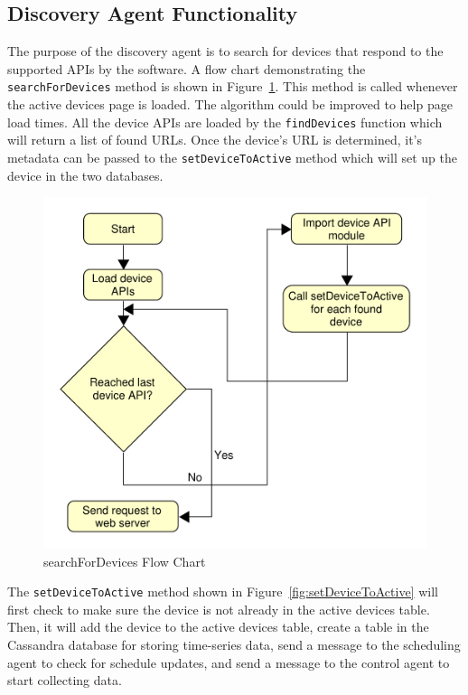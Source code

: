 \subsection{Discovery Agent Functionality}
The purpose of the discovery agent is to search for devices that respond to the supported APIs by the software. A flow chart demonstrating the \texttt{searchForDevices} method is shown in Figure~\ref{fig:searchForDevices}. This method is called whenever the active devices page is loaded. The algorithm could be improved to help page load times. All the device APIs are loaded by the \texttt{findDevices} function which will return a list of found URLs. Once the device's URL is determined, it's metadata can be passed to the \texttt{setDeviceToActive} method which will set up the device in the two databases.

\begin{figure}[H]
    \centering
    \includegraphics[scale=0.5]{figs/agents/searchForDevices.pdf}
    \caption{searchForDevices Flow Chart}
    \label{fig:searchForDevices}
\end{figure}
The \texttt{setDeviceToActive} method shown in Figure~\ref{fig:setDeviceToActive} will first check to make sure the device is not already in the active devices table. Then, it will add the device to the active devices table, create a table in the Cassandra database for storing time-series data, send a message to the scheduling agent to check for schedule updates, and send a message to the control agent to start collecting data.
